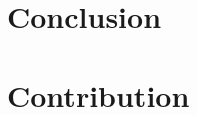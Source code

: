 \documentclass[sigconf, nonacm]{acmart}
\begin{document}
\section{Conclusion}

\section{Contribution}












\end{document}
